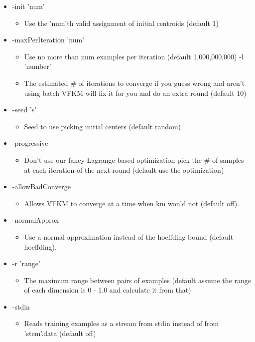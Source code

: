 \begin{itemize}
\item -init 'num'\begin{itemize}
\item Use the 'num'th valid assignment of initial centroids (default 1)\end{itemize}
\item -max\-Per\-Iteration 'num'\begin{itemize}
\item Use no more than num examples per iteration (default 1,000,000,000) -l 'number'\item The estimated \# of iterations to converge if you guess wrong and aren't using batch VFKM will fix it for you and do an extra round (default 10)\end{itemize}
\item -seed 's'\begin{itemize}
\item Seed to use picking initial centers (default random)\end{itemize}
\item -progressive\begin{itemize}
\item Don't use our fancy Lagrange based optimization pick the \# of samples at each iteration of the next round (default use the optimization)\end{itemize}
\item -allow\-Bad\-Converge\begin{itemize}
\item Allows VFKM to converge at a time when km would not (default off).\end{itemize}
\item -normal\-Approx\begin{itemize}
\item Use a normal approximation instead of the hoeffding bound (default hoeffding).\end{itemize}
\item -r 'range'\begin{itemize}
\item The maximum range between pairs of examples (default assume the range of each dimension is 0 - 1.0 and calculate it from that)\end{itemize}
\item -stdin\begin{itemize}
\item Reads training examples as a stream from stdin instead of from 'stem'.data (default off)\end{itemize}

\end{itemize}
